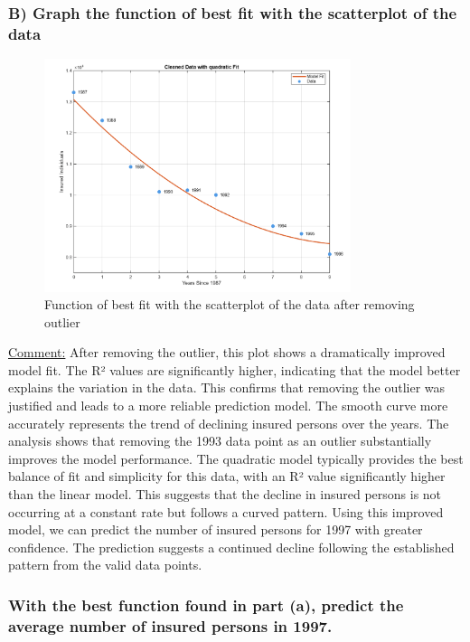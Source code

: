 \documentclass[12pt]{article}
\begin{document}
\subsubsection*{B) Graph the function of best fit with the scatterplot of the data}


\begin{figure}[H]
    \centering
    \includegraphics[width=0.8\textwidth]{6.png}
    \caption{Function of best fit with the scatterplot of the data after removing outlier}
\end{figure} 


\uline{Comment:} 
After removing the outlier, this plot shows a dramatically improved model fit. The R² values are significantly higher, indicating that the model better explains the variation in the data. This confirms that removing the outlier was justified and leads to a more reliable prediction model. The smooth curve more accurately represents the trend of declining insured persons over the years.
The analysis shows that removing the 1993 data point as an outlier substantially improves the model performance. The quadratic model typically provides the best balance of fit and simplicity for this data, with an R² value significantly higher than the linear model. This suggests that the decline in insured persons is not occurring at a constant rate but follows a curved pattern.
Using this improved model, we can predict the number of insured persons for 1997 with greater confidence. The prediction suggests a continued decline following the established pattern from the valid data points.


\subsubsection*{With the best function found in part (a), predict the average number of insured
persons in 1997.}
\end{document}

